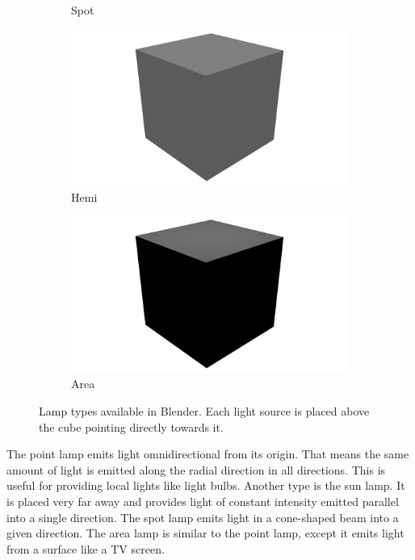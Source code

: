 \begin{figure}
\begin{subfigure}{0.19\textwidth}
		\caption{Spot}
	\end{subfigure}
	\begin{subfigure}{0.19\textwidth}
		\centering
		\includegraphics[width=\textwidth]{images/hemi.png}
		\caption{Hemi}
	\end{subfigure}
	\begin{subfigure}{0.19\textwidth}
		\centering
		\includegraphics[width=\textwidth]{images/area.png}
		\caption{Area}
	\end{subfigure}
	\caption[Lamp Types Available in Blender]{Lamp types available in Blender. Each light source is placed above the cube pointing directly towards it.}
	\label{fig:blender-lamps}
\end{figure}
The point lamp emits light omnidirectional from its origin.
That means the same amount of light is emitted along the radial direction in all directions.
This is useful for providing local lights like light bulbs.
Another type is the sun lamp.
It is placed very far away and provides light of constant intensity emitted parallel into a single direction.
The spot lamp emits light in a cone-shaped beam into a given direction.
The area lamp is similar to the point lamp, except it emits light from a surface like a TV screen.

